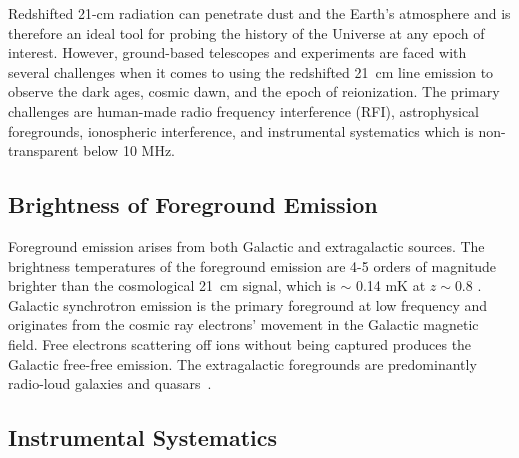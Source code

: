 	    Redshifted 21-cm radiation can penetrate dust and the Earth's atmosphere and is therefore an ideal tool for probing the history of the Universe at any epoch of interest. However, ground-based telescopes and experiments are faced with several challenges when it comes to using the redshifted \SI{21}{cm} line emission to observe the dark ages, cosmic dawn, and the epoch of reionization. The primary challenges are human-made radio frequency interference (RFI), astrophysical foregrounds, ionospheric interference, and instrumental systematics which is non-transparent below 10 MHz. 
	    
	    \subsection*{Brightness of Foreground Emission}
	    
	    Foreground emission arises from both Galactic and extragalactic sources. The brightness temperatures of the foreground emission are 4-5 orders of magnitude brighter than the cosmological \SI{21}{cm} signal, which is $\sim$ 0.14 mK at $z\sim0.8$ . Galactic synchrotron emission is the primary foreground at low frequency and originates from the cosmic ray electrons' movement in the Galactic magnetic field. Free electrons scattering off ions without being captured produces the Galactic free-free emission. The extragalactic foregrounds are predominantly radio-loud galaxies and quasars~\citep{2018RAA....18..114H, 2008MNRAS.389.1319J}.
	    
	    \subsection*{Instrumental Systematics}\label{s:chall}

            
